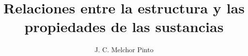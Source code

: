 \documentclass[12pt]{guia}
\title{Relaciones entre la estructura y las propiedades de las sustancias}
\author{J. C. Melchor Pinto}
\begin{document}
\pagestyle{headandfoot}
\addpoints
\INFO
\printanswers
\begin{multicols}{2}
    
\end{multicols}



\end{document}
